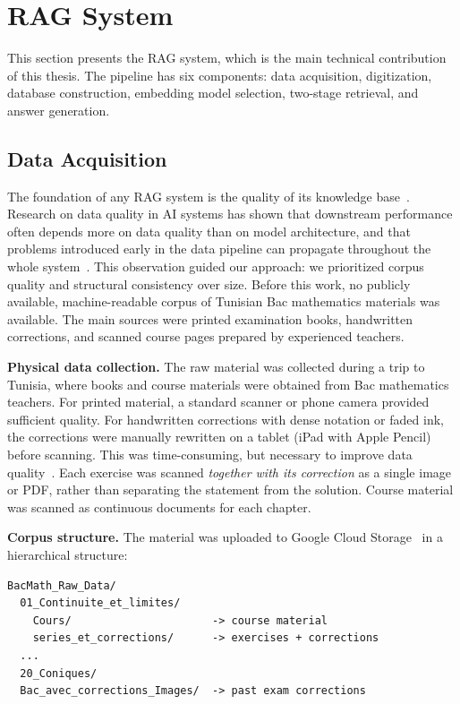 \section{RAG System}
\label{sec:rag-system}

This section presents the RAG system, which is the main technical
contribution of this thesis. The pipeline has six components: data
acquisition, digitization, database construction, embedding model selection,
two-stage retrieval, and answer generation.

\subsection{Data Acquisition}
\label{sec:data-acquisition}

The foundation of any RAG system is the quality of its knowledge
base~\cite{lewis2020rag, gao2024rag_survey}. Research on data quality in
AI systems has shown that downstream performance often depends more on data
quality than on model architecture, and that problems introduced early in
the data pipeline can propagate throughout the whole
system~\cite{sambasivan2021everyone}. This observation guided our approach:
we prioritized corpus quality and structural consistency over size.
Before this work, no publicly available, machine-readable corpus of Tunisian
Bac mathematics materials was available. The main sources were printed
examination books, handwritten corrections, and scanned course pages
prepared by experienced teachers.

\textbf{Physical data collection.} The raw material was collected during a
trip to Tunisia, where books and course materials were obtained from Bac
mathematics teachers. For printed material, a standard scanner or phone
camera provided sufficient quality. For handwritten corrections with dense
notation or faded ink, the corrections were manually rewritten on a tablet
(iPad with Apple Pencil) before scanning. This was time-consuming, but
necessary to improve data quality~\cite{sambasivan2021everyone,
wang2023ocrbench, mahdavi2019icdar_math}. Each exercise was scanned 
\textit{together with its correction} as a single
image or PDF, rather than separating the statement from the solution. Course
material was scanned as continuous documents for each chapter.

\textbf{Corpus structure.} The material was uploaded to Google Cloud
Storage~\cite{gcloud_storage2024} in a hierarchical structure:

\begin{verbatim}
BacMath_Raw_Data/
  01_Continuite_et_limites/
    Cours/                      -> course material
    series_et_corrections/      -> exercises + corrections
  ...
  20_Coniques/
  Bac_avec_corrections_Images/  -> past exam corrections
\end{verbatim}

